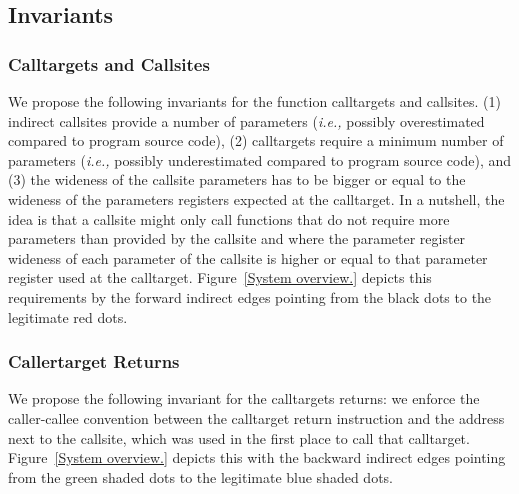 \subsection{Invariants}
\label{Invariants for Targets and Callsites}

\subsubsection{Calltargets and Callsites}
We propose the following invariants for the function calltargets and callsites.
(1) indirect callsites provide a number of parameters (\textit{i.e.,} possibly overestimated compared to program source code), 
(2) calltargets require a minimum number of parameters (\textit{i.e.,} possibly underestimated compared to program source code), and
(3) the wideness of the callsite parameters has to be bigger or equal to the wideness of the parameters registers expected at the calltarget.
In a nutshell, the idea is that a callsite might only call functions that do not require more parameters than provided by the callsite and
where the parameter register wideness of each parameter of the callsite is higher or equal to that parameter register used at the calltarget.
Figure~\ref{System overview.} depicts this requirements by the forward indirect edges pointing from the black dots to the legitimate
red dots.

\subsubsection{Callertarget Returns}
We propose the following invariant for the calltargets returns:
we enforce the caller-callee convention between the calltarget return instruction and the address next 
to the callsite, which was used in the first place to call that calltarget.
Figure~\ref{System overview.} depicts this with the backward indirect edges pointing from the green shaded dots to the legitimate
blue shaded dots.

